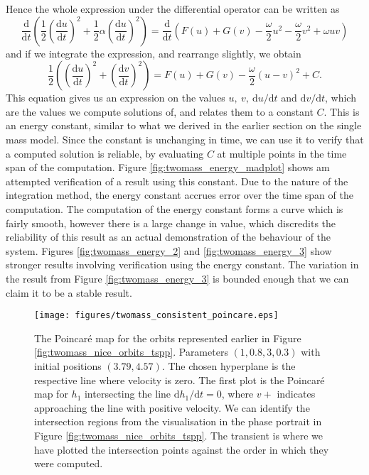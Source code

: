 \documentclass{article}
\begin{document}
Hence the whole expression under the differential operator can be written as
\begin{equation*}
    \frac{\mathrm{d}}{\mathrm{d}t}\left(
        \frac{1}{2}\left(\frac{\mathrm{d}u}{\mathrm{d}t}\right)^2 + \frac{1}{2}\alpha\left(\frac{\mathrm{d}u}{\mathrm{d}t}\right)^2
    \right) = \frac{\mathrm{d}}{\mathrm{d}t}\left(
        F(u) + G(v) - \frac{\omega}{2}u^2 -\frac{\omega}{2}v^2 + \omega uv
    \right) 
\end{equation*}
and if we integrate the expression, and rearrange slightly, we obtain
\begin{equation}
    \frac{1}{2}\left(
        \left(\frac{\mathrm{d}u}{\mathrm{d}t}\right)^2 + \left(\frac{\mathrm{d}v}{\mathrm{d}t}\right)^2
    \right) = F(u) + G(v) - \frac{\omega}{2}(u-v)^2 + C.
    \label{eqn:twomass_energy_constant}
\end{equation}
This equation gives us an expression on the values \(u,~v,~\mathrm{d}u/\mathrm{d}t\) and \(\mathrm{d}v/\mathrm{d}t\),
which are the values we compute solutions of, and relates them to a constant $C$.
This is an energy constant, similar to what we derived in the earlier section on the single mass model.
Since the constant is unchanging in time, we can use it to verify that a computed solution is reliable,
by evaluating $C$ at multiple points in the time span of the computation.
Figure \ref{fig:twomass_energy_madplot} shows am attempted verification of a result using this constant.
Due to the nature of the integration method,
the energy constant accrues error over the time span of the computation.
The computation of the energy constant forms a curve which is fairly smooth,
however there is a large change in value,
which discredits the reliability of this result as an actual demonstration of the behaviour of the system.
Figures \ref{fig:twomass_energy_2} and \ref{fig:twomass_energy_3} show stronger results involving verification using the energy constant.
The variation in the result from Figure \ref{fig:twomass_energy_3} is bounded enough that we can claim it to be a stable result.

\begin{figure}
    \centering
    \texttt{[image: figures/twomass\_consistent\_poincare.eps]}
    \caption{
        The Poincar\'e map for the orbits represented earlier in Figure \ref{fig:twomass_nice_orbits_tspp}.
        Parameters \((1, 0.8, 3, 0.3)\) with initial positions \((3.79,4.57)\).
        The chosen hyperplane is the respective line where velocity is zero.
        The first plot is the Poincar\'e map for $h_1$ intersecting the line $\mathrm{d}h_1/\mathrm{d}t = 0$,
        where $v+$ indicates approaching the line with positive velocity.
        We can identify the intersection regions from the visualisation in the phase portrait in Figure \ref{fig:twomass_nice_orbits_tspp}.
        The transient is where we have plotted the intersection points against the order in which they were computed.
    }
    \label{fig:twomass_poincare_nice}
\end{figure}
\end{document}
